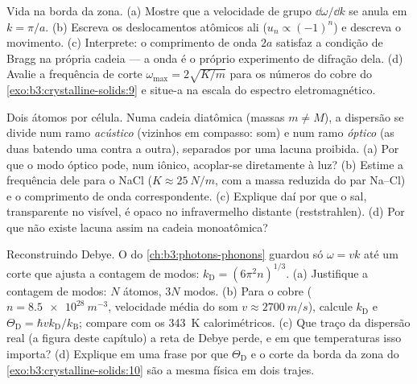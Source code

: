 \begin{exercise}[$\star\star\star$]\label{exo:b3:crystalline-solids:10}
Vida na borda da zona. (a) Mostre que a velocidade de grupo
$\dd\omega/\dd k$ se anula em $k = \pi/a$. (b) Escreva os
deslocamentos atômicos ali ($u_n \propto (-1)^n$) e descreva o
movimento. (c) Interprete: o comprimento de onda $2a$ satisfaz a
condição de Bragg na própria cadeia --- a onda é o próprio experimento
de difração dela. (d) Avalie a frequência de corte
$\omega_{\text{max}} = 2\sqrt{K/m}$ para os números do cobre do
\cref{exo:b3:crystalline-solids:9} e situe-a na escala do
espectro eletromagnético.
\end{exercise}

\begin{exercise}[$\star\star\star$]\label{exo:b3:crystalline-solids:11}
Dois átomos por célula. Numa cadeia diatômica (massas $m \ne M$), a
dispersão se divide num ramo \emph{acústico} (vizinhos em
compasso: som) e num ramo \emph{óptico} (as duas 
batendo uma contra a outra), separados por uma lacuna proibida. (a) Por
que o modo óptico pode, num  iônico, acoplar-se diretamente à
luz? (b) Estime a frequência dele para o NaCl ($K \approx
\qty{25}{N/m}$, com a massa reduzida do par Na--Cl) e o
comprimento de onda correspondente. (c) Explique daí por que o sal,
transparente no visível, é opaco no infravermelho distante
(reststrahlen). (d) Por que não existe lacuna assim na cadeia monoatômica?
\end{exercise}

\begin{exercise}[$\star\star\star$]\label{exo:b3:crystalline-solids:12}
Reconstruindo Debye. O  do \cref{ch:b3:photons-phonons}
guardou só $\omega = vk$ até um corte que ajusta a contagem de modos:
$k_{\text{D}} = (6\pi^2n)^{1/3}$. (a) Justifique a contagem de modos:
$N$ átomos, $3N$ modos. (b) Para o cobre ($n = \qty{8.5e28}{m^{-3}}$,
velocidade média do som $v \approx \qty{2700}{m/s}$), calcule
$k_{\text{D}}$ e $\Theta_{\text{D}} =
\hbar vk_{\text{D}}/k_{\text{B}}$; compare com os \qty{343}{K}
calorimétricos. (c) Que traço da dispersão real (a figura deste
capítulo) a reta de Debye perde, e em que temperaturas isso
importa? (d) Explique em uma frase por que
$\Theta_{\text{D}}$ e o corte da borda da zona do
\cref{exo:b3:crystalline-solids:10} são a mesma física em dois
trajes.
\end{exercise}

